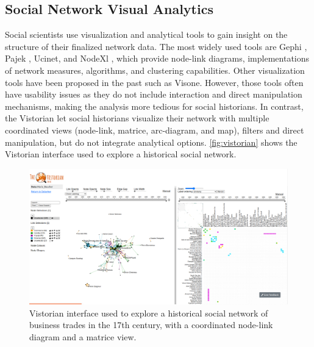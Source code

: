 \subsection{Social Network Visual Analytics}\label{subsec:social-network-visual-analytics}

Social scientists use visualization and analytical tools to gain insight on the structure of their finalized network data.
The most widely used tools are Gephi \cite{Gephi}, Pajek \cite{mrvarAnalysisVisualizationLarge2016}, Ucinet\cite{johnsonUCINETSoftwareTool1987}, and NodeXl \cite{NodeXL}, which provide node-link diagrams, implementations of network measures, algorithms, and clustering capabilities.
Other \sna visualization tools have been proposed in the past such as Visone\cite{baurVisoneSoftwareVisual2002}.
However, those tools often have usability issues as they do not include interaction and direct manipulation mechanisms, making the analysis more tedious for social historians.
In contrast, the Vistorian\cite{serranomolineroUnderstandingUseVistorian2017} let social historians visualize their network with multiple coordinated views (node-link, matrice, arc-diagram, and map), filters and direct manipulation, but do not integrate analytical options.
\autoref{fig:vistorian} shows the Vistorian interface used to explore a historical social network.
\begin{figure}[!ht]
    \centering %
    \includegraphics[width=1\textwidth,trim={0 1cm 0 0},clip]{static/figures/RelatedWork/vistorian}
    \caption{Vistorian interface\cite{serranomolineroUnderstandingUseVistorian2017} used to explore a historical social network of business trades in the 17th century, with a coordinated node-link diagram and a matrice view.}
    \label{fig:vistorian}
\end{figure}
